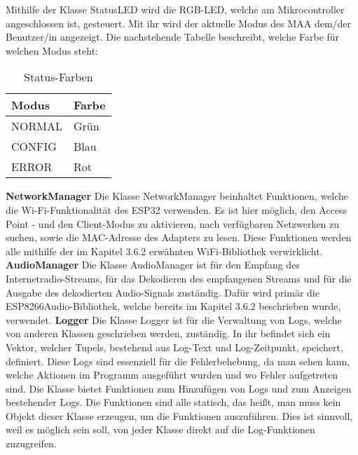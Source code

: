 \documentclass[11pt, twoside]{article}
\begin{document}
Mithilfe der Klasse \glqq StatusLED\grqq{} wird die RGB-LED, welche am Mikrocontroller angeschlossen ist, gesteuert. Mit ihr wird der aktuelle Modus des MAA dem/der Benutzer/in angezeigt. Die nachstehende Tabelle beschreibt, welche Farbe für welchen Modus steht: \newline
\begin{table}[H]
	\begin{tabular}{|l|l|}
		\hline
		\textbf{Modus} & \textbf{Farbe} \\
		\hline
		NORMAL & Grün \\
		\hline
		CONFIG & Blau \\
		\hline
		ERROR & Rot \\
		\hline
	\end{tabular}
	\caption{Status-Farben}
\end{table}
\noindent %
\textbf{NetworkManager}\newline
Die Klasse \glqq NetworkManager\grqq{} beinhaltet Funktionen, welche die Wi-Fi-Funktionalität des ESP32 verwenden. Es ist hier möglich, den Access Point - und den Client-Modus zu aktivieren, nach verfügbaren Netzwerken zu suchen, sowie die MAC-Adresse des Adapters zu lesen. Diese Funktionen werden alle mithilfe der im Kapitel 3.6.2 erwähnten \glqq WiFi\grqq{}-Bibliothek verwirklicht.
\vspace{4mm}\newline
\textbf{AudioManager}\newline
Die Klasse \glqq AudioManager\grqq{} ist für den Empfang des Internetradio-Streams, für das Dekodieren des empfangenen Streams und für die Ausgabe des dekodierten Audio-Signals zuständig. Dafür wird primär die \glqq ESP8266Audio\grqq{}-Bibliothek, welche bereits im Kapitel 3.6.2 beschrieben wurde, verwendet.
\vspace{4mm}\newline
\textbf{Logger}\newline
Die Klasse \glqq Logger\grqq{} ist für die Verwaltung von Logs, welche von anderen Klassen geschrieben werden, zuständig. In ihr befindet sich ein Vektor, welcher Tupels, bestehend aus Log-Text und Log-Zeitpunkt, speichert, definiert. Diese Logs sind essenziell für die Fehlerbehebung, da man sehen kann, welche Aktionen im Programm ausgeführt wurden und wo Fehler aufgetreten sind. Die Klasse bietet Funktionen zum Hinzufügen von Logs und zum Anzeigen bestehender Logs. Die Funktionen sind alle statisch, das heißt, man muss kein Objekt dieser Klasse erzeugen, um die Funktionen auszuführen. Dies ist sinnvoll, weil es möglich sein soll, von jeder Klasse direkt auf die Log-Funktionen zuzugreifen.
\end{document}
